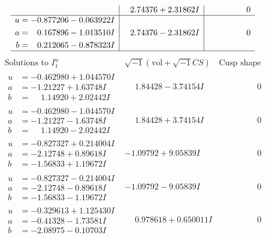 \documentclass[1p]{elsarticle_modified}
\theoremstyle{definition}
\newcommand{\I}{\sqrt{-1}}
\begin{document}
$$\begin{array}{c|c|c}
 & \phantom{-}2.74376 + 2.31862 I & \phantom{-0.000000 } 0 \\ \hline\begin{aligned}
u &= -0.877206 - 0.063922 I \\
a &= \phantom{-}0.167896 - 1.013510 I \\
b &= \phantom{-}0.212065 - 0.878323 I\end{aligned}
 & \phantom{-}2.74376 - 2.31862 I & \phantom{-0.000000 } 0\\
 \hline 
 \end{array}$$\newpage$$\begin{array}{c|c|c}  
\text{Solutions to }I^u_{1}& \I (\text{vol} + \sqrt{-1}CS) & \text{Cusp shape}\\
 \hline 
\begin{aligned}
u &= -0.462980 + 1.044570 I \\
a &= -1.21227 + 1.63748 I \\
b &= \phantom{-}1.14920 + 2.02442 I\end{aligned}
 & \phantom{-}1.84428 - 3.74154 I & \phantom{-0.000000 } 0 \\ \hline\begin{aligned}
u &= -0.462980 - 1.044570 I \\
a &= -1.21227 - 1.63748 I \\
b &= \phantom{-}1.14920 - 2.02442 I\end{aligned}
 & \phantom{-}1.84428 + 3.74154 I & \phantom{-0.000000 } 0 \\ \hline\begin{aligned}
u &= -0.827327 + 0.214004 I \\
a &= -2.12748 + 0.89618 I \\
b &= -1.56833 + 1.19672 I\end{aligned}
 & -1.09792 + 9.05839 I & \phantom{-0.000000 } 0 \\ \hline\begin{aligned}
u &= -0.827327 - 0.214004 I \\
a &= -2.12748 - 0.89618 I \\
b &= -1.56833 - 1.19672 I\end{aligned}
 & -1.09792 - 9.05839 I & \phantom{-0.000000 } 0 \\ \hline\begin{aligned}
u &= -0.329613 + 1.125430 I \\
a &= -0.41328 - 1.73581 I \\
b &= -2.08975 - 0.10703 I\end{aligned}
 & \phantom{-}0.978618 + 0.650011 I & \phantom{-0.000000 } 0 \\ \hline\begin{aligned}

\end{aligned}
\end{array}$$
\end{document}
